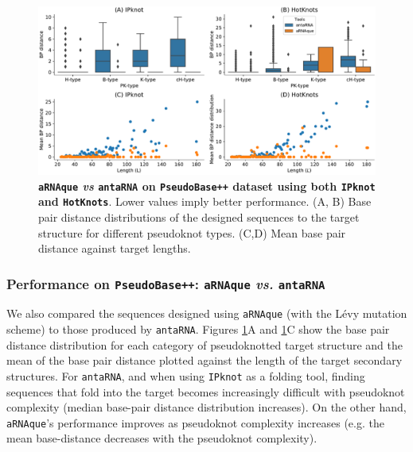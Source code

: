 \begin{figure}[t!]
	\includegraphics[width=1.0\linewidth]{../res/images/arnaque/fig5.pdf}
	\caption{\textbf{\texttt{aRNAque} \emph{vs} \texttt{antaRNA} on \texttt{PseudoBase++} dataset using both  \texttt{IPknot} and \texttt{HotKnots}}. Lower values imply better performance. (A, B) Base pair distance distributions of the designed sequences to the target structure for different pseudoknot types. (C,D) Mean base pair distance against target lengths. }\label{Fig:antaRNA_vs_aRNAque}
\end{figure}
\subsubsection{Performance on \texttt{PseudoBase++}: \texttt{aRNAque} \emph{vs.} \texttt{antaRNA}}
We also compared the sequences designed using \texttt{aRNAque} (with the Lévy mutation scheme) to those produced by \texttt{antaRNA}. Figures \ref{Fig:antaRNA_vs_aRNAque}A and \ref{Fig:antaRNA_vs_aRNAque}C show the base pair distance distribution for each category of pseudoknotted target structure and the mean of the base pair distance plotted against the length of the target secondary structures. For \texttt{antaRNA}, and when using \texttt{IPknot} as a folding tool, finding sequences that fold into the target becomes increasingly difficult with pseudoknot complexity (median base-pair distance distribution increases). On the other hand, \texttt{aRNAque}’s performance improves as pseudoknot complexity increases (e.g. the mean base-distance decreases with the pseudoknot complexity). 

